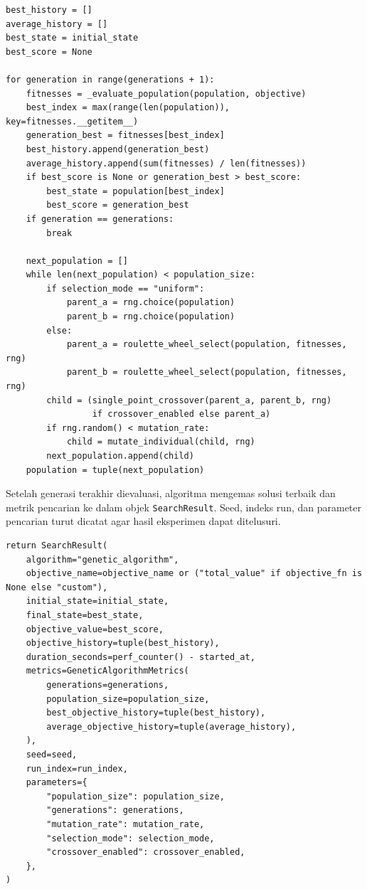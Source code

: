 \begin{lstlisting}[caption={Loop generasi dan pembentukan populasi baru},label={lst:ga-generation-loop}]
best_history = []
average_history = []
best_state = initial_state
best_score = None

for generation in range(generations + 1):
    fitnesses = _evaluate_population(population, objective)
    best_index = max(range(len(population)), key=fitnesses.__getitem__)
    generation_best = fitnesses[best_index]
    best_history.append(generation_best)
    average_history.append(sum(fitnesses) / len(fitnesses))
    if best_score is None or generation_best > best_score:
        best_state = population[best_index]
        best_score = generation_best
    if generation == generations:
        break

    next_population = []
    while len(next_population) < population_size:
        if selection_mode == "uniform":
            parent_a = rng.choice(population)
            parent_b = rng.choice(population)
        else:
            parent_a = roulette_wheel_select(population, fitnesses, rng)
            parent_b = roulette_wheel_select(population, fitnesses, rng)
        child = (single_point_crossover(parent_a, parent_b, rng)
                 if crossover_enabled else parent_a)
        if rng.random() < mutation_rate:
            child = mutate_individual(child, rng)
        next_population.append(child)
    population = tuple(next_population)
\end{lstlisting}

Setelah generasi terakhir dievaluasi, algoritma mengemas solusi terbaik dan metrik pencarian ke dalam objek \texttt{SearchResult}. Seed, indeks run, dan parameter pencarian turut dicatat agar hasil eksperimen dapat ditelusuri.

\begin{lstlisting}[caption={Mengemas solusi dan metrik hasil pencarian},label={lst:ga-result}]
return SearchResult(
    algorithm="genetic_algorithm",
    objective_name=objective_name or ("total_value" if objective_fn is None else "custom"),
    initial_state=initial_state,
    final_state=best_state,
    objective_value=best_score,
    objective_history=tuple(best_history),
    duration_seconds=perf_counter() - started_at,
    metrics=GeneticAlgorithmMetrics(
        generations=generations,
        population_size=population_size,
        best_objective_history=tuple(best_history),
        average_objective_history=tuple(average_history),
    ),
    seed=seed,
    run_index=run_index,
    parameters={
        "population_size": population_size,
        "generations": generations,
        "mutation_rate": mutation_rate,
        "selection_mode": selection_mode,
        "crossover_enabled": crossover_enabled,
    },
)
\end{lstlisting}

